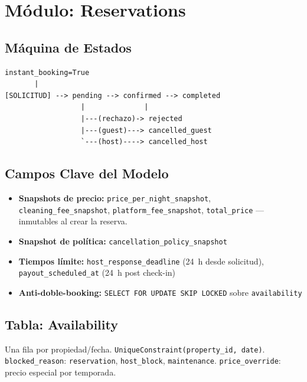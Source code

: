 \documentclass[12pt,a4paper]{report}
\begin{document}
\section{M\'odulo: Reservations}

\subsection{M\'aquina de Estados}

\begin{tcolorbox}[beelinfo, title={Estados de Reserva}]
\begin{lstlisting}[numbers=none, frame=none, xleftmargin=0pt]
instant_booking=True
       |
[SOLICITUD] --> pending --> confirmed --> completed
                  |              |
                  |---(rechazo)-> rejected
                  |---(guest)---> cancelled_guest
                  `---(host)----> cancelled_host
\end{lstlisting}
\end{tcolorbox}

\subsection{Campos Clave del Modelo}

\begin{itemize}[leftmargin=*]
  \item \textbf{Snapshots de precio:} \texttt{price\_per\_night\_snapshot},
        \texttt{cleaning\_fee\_snapshot}, \texttt{platform\_fee\_snapshot},
        \texttt{total\_price} --- inmutables al crear la reserva.
  \item \textbf{Snapshot de pol\'itica:} \texttt{cancellation\_policy\_snapshot}
  \item \textbf{Tiempos l\'imite:} \texttt{host\_response\_deadline} (24~h desde solicitud),
        \texttt{payout\_scheduled\_at} (24~h post check-in)
  \item \textbf{Anti-doble-booking:} \texttt{SELECT FOR UPDATE SKIP LOCKED} sobre \texttt{availability}
\end{itemize}

\subsection{Tabla: Availability}

Una fila por propiedad/fecha. \texttt{UniqueConstraint(property\_id, date)}.
\texttt{blocked\_reason}: \texttt{reservation}, \texttt{host\_block}, \texttt{maintenance}.
\texttt{price\_override}: precio especial por temporada.
\end{document}
